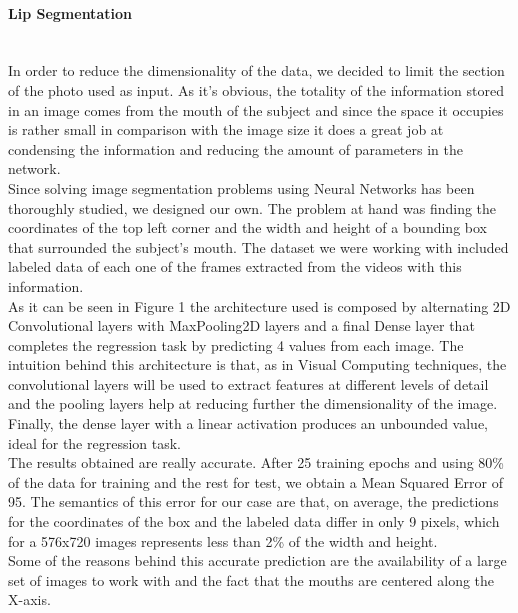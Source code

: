 \documentclass{article}[10pt]
\begin{document}
\begin{multicols}{2}
\paragraph{Lip Segmentation} ~\\

In order to reduce the dimensionality of the data, we decided to limit the
section of the photo used as input. As it's obvious, the totality of the
information stored in an image comes from the mouth of the subject and since the
space it occupies is rather small in comparison with the image size it does a
great job at condensing the information and reducing the amount of parameters in
the network.\\

Since solving image segmentation problems using Neural Networks has been
thoroughly studied, we designed our own. The problem at hand was finding the
coordinates of the top left corner and the width and height of a bounding box
that surrounded the subject's mouth. The dataset we were working with included
labeled data of each one of the frames extracted from the videos with this
information. \\

As it can be seen in Figure 1 the architecture used is composed by alternating
2D Convolutional layers with MaxPooling2D layers and a final Dense layer that
completes the regression task by predicting 4 values from each image. The
intuition behind this architecture is that, as in Visual Computing techniques,
the convolutional layers will be used to extract features at different levels of
detail and the pooling layers help at reducing further the dimensionality of the
image. Finally, the dense layer with a linear activation produces an unbounded
value, ideal for the regression task.\\


The results obtained are really accurate. After 25 training epochs and using 80\%
of the data for training and the rest for test, we obtain a Mean Squared Error of
95. The semantics of this error for our case are that, on average, the predictions
for the coordinates of the box and the labeled data differ in only 9 pixels, which
for a 576x720 images represents less than 2\% of the width and height.\\


Some of the reasons behind this accurate prediction are the availability of a
large set of images to work with and the fact that the mouths are centered along
the X-axis.


\end{multicols}
\end{document}

